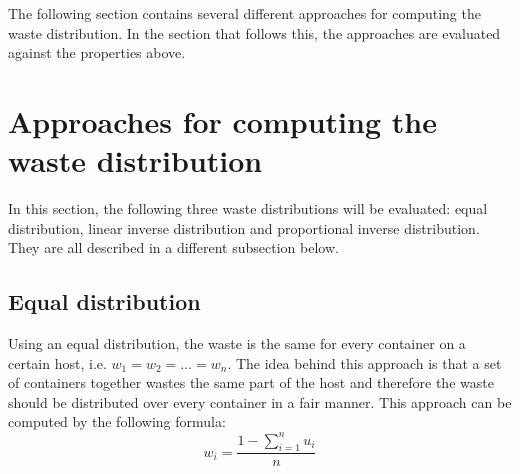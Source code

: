 The following section contains several different approaches for computing the waste distribution. In the section that follows this, the approaches are evaluated against the properties above.

\section{Approaches for computing the waste distribution} \label{sec:approaches}
In this section, the following three waste distributions will be evaluated: equal distribution, linear inverse distribution and proportional inverse distribution. They are all described in a different subsection below.

\subsection{Equal distribution} \label{sec:equal}
Using an equal distribution, the waste is the same for every container on a certain host, i.e. $w_1 = w_2 = \dots = w_n$. The idea behind this approach is that a set of containers together wastes the same part of the host and therefore the waste should be distributed over every container in a fair manner. This approach can be computed by the following formula:
\begin{equation}
w_i = \frac{1 - \sum_{i=1}^n u_i}{n}
\end{equation}


